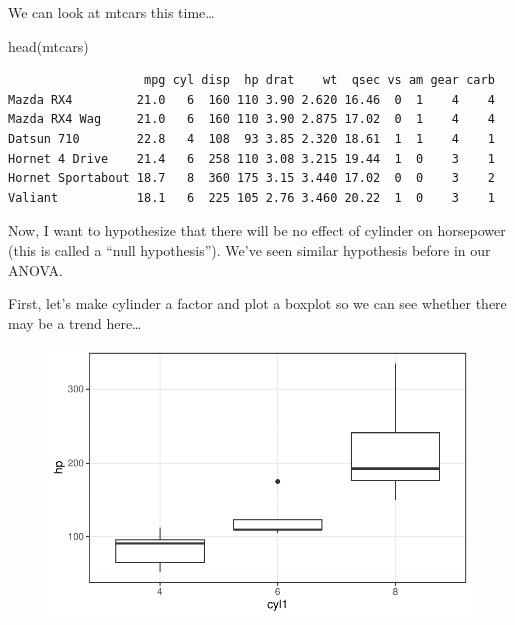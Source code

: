 \documentclass[
  letterpaper,
  DIV=11,
  numbers=noendperiod]{scrartcl}
\newenvironment{Shaded}{\begin{snugshade}}{\end{snugshade}}
\newcommand{\AttributeTok}[1]{\textcolor[rgb]{0.40,0.45,0.13}{#1}}
\newcommand{\FunctionTok}[1]{\textcolor[rgb]{0.28,0.35,0.67}{#1}}
\newcommand{\NormalTok}[1]{\textcolor[rgb]{0.00,0.23,0.31}{#1}}
\newcommand{\OtherTok}[1]{\textcolor[rgb]{0.00,0.23,0.31}{#1}}
\newcommand{\SpecialCharTok}[1]{\textcolor[rgb]{0.37,0.37,0.37}{#1}}
\begin{document}
We can look at mtcars this time\ldots{}

\begin{Shaded}
\begin{Highlighting}[]
\FunctionTok{head}\NormalTok{(mtcars)}
\end{Highlighting}
\end{Shaded}

\begin{verbatim}
                   mpg cyl disp  hp drat    wt  qsec vs am gear carb
Mazda RX4         21.0   6  160 110 3.90 2.620 16.46  0  1    4    4
Mazda RX4 Wag     21.0   6  160 110 3.90 2.875 17.02  0  1    4    4
Datsun 710        22.8   4  108  93 3.85 2.320 18.61  1  1    4    1
Hornet 4 Drive    21.4   6  258 110 3.08 3.215 19.44  1  0    3    1
Hornet Sportabout 18.7   8  360 175 3.15 3.440 17.02  0  0    3    2
Valiant           18.1   6  225 105 2.76 3.460 20.22  1  0    3    1
\end{verbatim}

Now, I want to hypothesize that there will be no effect of cylinder on
horsepower (this is called a ``null hypothesis''). We've seen similar
hypothesis before in our ANOVA.

First, let's make cylinder a factor and plot a boxplot so we can see
whether there may be a trend here\ldots{}

\begin{Shaded}
\end{Shaded}

\begin{figure}[H]

{\centering \includegraphics{cor_reg_chi_files/figure-pdf/unnamed-chunk-17-1.pdf}

}

\end{figure}
\end{document}
